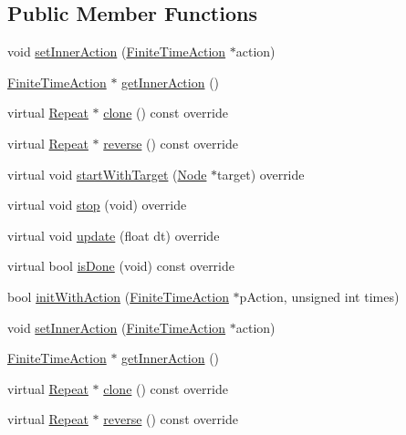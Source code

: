 \subsection*{Public Member Functions}
\begin{DoxyCompactItemize}
\item 
void \hyperlink{classRepeat_a478e724496a209ad21dc17d69641b46e}{set\+Inner\+Action} (\hyperlink{classFiniteTimeAction}{Finite\+Time\+Action} $\ast$action)
\item 
\hyperlink{classFiniteTimeAction}{Finite\+Time\+Action} $\ast$ \hyperlink{classRepeat_ad5fb2fc246a8ada68b97e0b3f3d64e30}{get\+Inner\+Action} ()
\item 
virtual \hyperlink{classRepeat}{Repeat} $\ast$ \hyperlink{classRepeat_a758165a1dbeecf9ae2a9027da17bd115}{clone} () const override
\item 
virtual \hyperlink{classRepeat}{Repeat} $\ast$ \hyperlink{classRepeat_ac20df5514656526699db17946a51279a}{reverse} () const override
\item 
virtual void \hyperlink{classRepeat_a9581525d20c31f12cb94015183ffa220}{start\+With\+Target} (\hyperlink{classNode}{Node} $\ast$target) override
\item 
virtual void \hyperlink{classRepeat_ae7d7d020a49dbbe3ee160fe22db02ad2}{stop} (void) override
\item 
virtual void \hyperlink{classRepeat_afc3c9f93a8dae8689f177a250309518f}{update} (float dt) override
\item 
virtual bool \hyperlink{classRepeat_a01f8323eda5c46d6f103e8f8c5027f30}{is\+Done} (void) const override
\item 
bool \hyperlink{classRepeat_a26f37537ecb708cb71f81f681d390965}{init\+With\+Action} (\hyperlink{classFiniteTimeAction}{Finite\+Time\+Action} $\ast$p\+Action, unsigned int times)
\item 
void \hyperlink{classRepeat_a478e724496a209ad21dc17d69641b46e}{set\+Inner\+Action} (\hyperlink{classFiniteTimeAction}{Finite\+Time\+Action} $\ast$action)
\item 
\hyperlink{classFiniteTimeAction}{Finite\+Time\+Action} $\ast$ \hyperlink{classRepeat_ad5fb2fc246a8ada68b97e0b3f3d64e30}{get\+Inner\+Action} ()
\item 
virtual \hyperlink{classRepeat}{Repeat} $\ast$ \hyperlink{classRepeat_a5f4faaabbc706ca8e4886fc00822cd1e}{clone} () const override
\item 
virtual \hyperlink{classRepeat}{Repeat} $\ast$ \hyperlink{classRepeat_a8351085b890ce8ff15f8781b152df2e7}{reverse} () const override

\end{DoxyCompactItemize}
